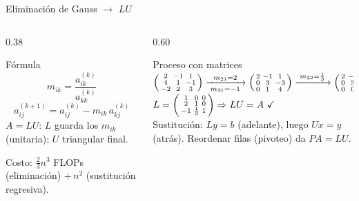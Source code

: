 \documentclass[aspectratio=169,10pt]{beamer}
\begin{document}
\begin{frame}{Eliminación de Gauss $\rightarrow$ $LU$}
\begin{columns}[T]
\begin{column}{0.38\textwidth}
\begin{cardidea}{Fórmula}{\faSuperscript}
$$m_{ik}=\frac{a_{ik}^{(k)}}{a_{kk}^{(k)}}$$
$$a_{ij}^{(k+1)}=a_{ij}^{(k)}-m_{ik}\,a_{kj}^{(k)}$$
{\footnotesize $A=LU$: $L$ guarda los $m_{ik}$ (unitaria); $U$ triangular final.}
\end{cardidea}
\vspace{1mm}
\begin{cardnota}[\faInfoCircle]{\footnotesize Costo: $\tfrac{2}{3}n^3$ FLOPs (eliminación) $+\,n^2$ (sustitución regresiva).}\end{cardnota}
\end{column}
\begin{column}{0.60\textwidth}
\begin{cardgear}{Proceso con matrices}{\faTable}
{\scriptsize
$\begin{psmallmatrix}2&-1&1\\4&1&-1\\-2&2&3\end{psmallmatrix}\xrightarrow[\;m_{31}=-1\;]{\;m_{21}=2\;}\begin{psmallmatrix}2&-1&1\\0&3&-3\\0&1&4\end{psmallmatrix}\xrightarrow{\;m_{32}=\frac13\;}\begin{psmallmatrix}2&-1&1\\0&3&-3\\0&0&5\end{psmallmatrix}=U$}\\[2.4mm]
{\footnotesize $L=\begin{psmallmatrix}1&0&0\\2&1&0\\-1&\frac13&1\end{psmallmatrix}\Rightarrow LU=A\ \checkmark$\\[2mm]
Sustitución: $Ly=b$ (adelante), luego $Ux=y$ (atrás). Reordenar filas (pivoteo) da $PA=LU$.}
\end{cardgear}
\end{column}
\end{columns}
\end{frame}
\end{document}
